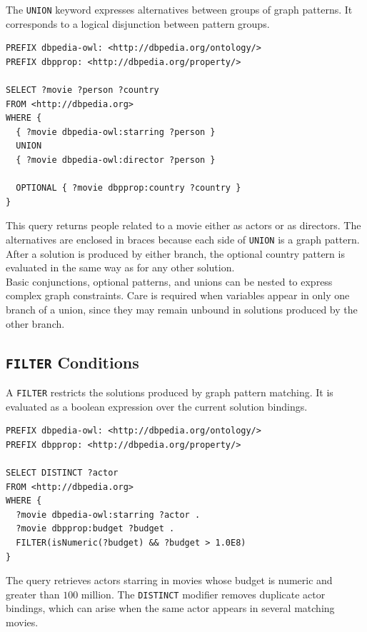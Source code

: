 \documentclass{scrbook}
\begin{document}
	The \texttt{UNION} keyword expresses alternatives between groups of graph patterns. It corresponds to a logical disjunction between pattern groups.
	
	\begin{lstlisting}
PREFIX dbpedia-owl: <http://dbpedia.org/ontology/>
PREFIX dbpprop: <http://dbpedia.org/property/>

SELECT ?movie ?person ?country
FROM <http://dbpedia.org>
WHERE {
  { ?movie dbpedia-owl:starring ?person }
  UNION
  { ?movie dbpedia-owl:director ?person }

  OPTIONAL { ?movie dbpprop:country ?country }
}
	\end{lstlisting}
	
	This query returns people related to a movie either as actors or as directors. The alternatives are enclosed in braces because each side of \texttt{UNION} is a graph pattern. After a solution is produced by either branch, the optional country pattern is evaluated in the same way as for any other solution.\\
	
	Basic conjunctions, optional patterns, and unions can be nested to express complex graph constraints. Care is required when variables appear in only one branch of a union, since they may remain unbound in solutions produced by the other branch.
	
	\subsection{\texttt{FILTER} Conditions}
	
	A \texttt{FILTER} restricts the solutions produced by graph pattern matching. It is evaluated as a boolean expression over the current solution bindings.
	
	\begin{lstlisting}
PREFIX dbpedia-owl: <http://dbpedia.org/ontology/>
PREFIX dbpprop: <http://dbpedia.org/property/>

SELECT DISTINCT ?actor
FROM <http://dbpedia.org>
WHERE {
  ?movie dbpedia-owl:starring ?actor .
  ?movie dbpprop:budget ?budget .
  FILTER(isNumeric(?budget) && ?budget > 1.0E8)
}
	\end{lstlisting}
	
	The query retrieves actors starring in movies whose budget is numeric and greater than \(100\) million. The \texttt{DISTINCT} modifier removes duplicate actor bindings, which can arise when the same actor appears in several matching movies.\\
	
\end{document}
